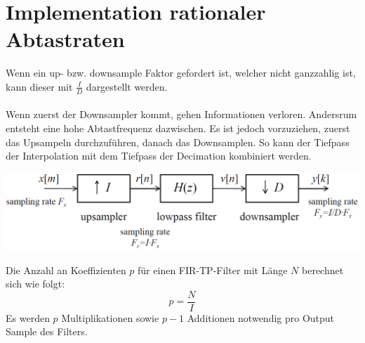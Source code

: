 \section{Implementation rationaler Abtastraten}
Wenn ein up- bzw. downsample Faktor gefordert ist, welcher nicht ganzzahlig ist,
kann dieser mit $\frac{I}{D}$ dargestellt werden.\\\\
Wenn zuerst der Downsampler kommt, gehen Informationen verloren. Andersrum
entsteht eine hohe Abtastfrequenz dazwischen. Es ist jedoch vorzuziehen,
zuerst das Upsampeln durchzuführen, danach das Downsamplen. So kann der Tiefpass 
der Interpolation mit dem Tiefpass der Decimation kombiniert werden.
\begin{center}
	\includegraphics[width=.6\textwidth]{../fig/sampling}
\end{center}
Die Anzahl an Koeffizienten $p$ für einen FIR-TP-Filter mit Länge $N$ berechnet sich wie folgt:
\[ p = \frac{N}{I} \]
Es werden $p$ Multiplikationen sowie $p-1$ Additionen notwendig pro Output Sample des Filters.
